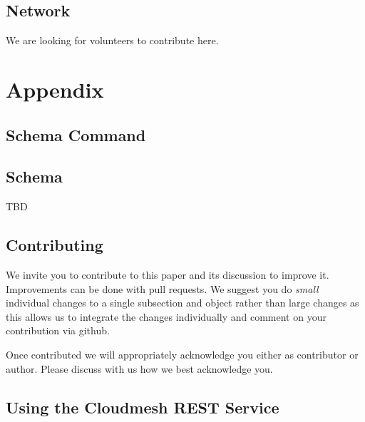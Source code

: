 \documentclass[10pt]{article}
\begin{document}
\subsection{Network}

We are looking for volunteers to contribute here.


%

\newpage

\appendix

\section{Appendix}

\subsection{Schema Command}




\subsection{Schema}\label{a:schema}

TBD


\subsection{Contributing}

We invite you to contribute to this paper and its discussion to
improve it. Improvements can be done with pull requests. We suggest
you do {\em small} individual changes to a single subsection and object
rather than large changes as this allows us to integrate the changes
individually and comment on your contribution via github.

Once contributed we will appropriately acknowledge you either as
contributor or author. Please discuss with us how we best acknowledge
you.

\subsection{Using the Cloudmesh REST Service} 
\end{document}
